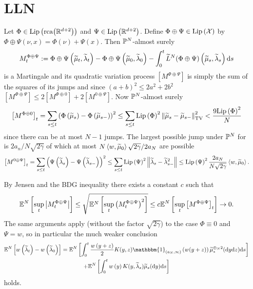 \section{LLN}
Let $\Phi \in \mathrm{Lip}\left({\mathrm{rca}{\left({\mathbb{R}^{d+2}}\right)}}\right)$ and $\Psi \in \mathrm{Lip}\left({\mathbb{R}^{d+2}}\right)$.  Define $\Phi \oplus \Psi \in \mathrm{Lip}\left({\mathcal{X}}\right)$ by
$\Phi \oplus \Psi(\nu,x) = \Phi(\nu) + \Psi(x)$.  Then $\mathbb{P}^N$-almost surely
\begin{equation}
    M^{\Phi \oplus \Psi}_t := \Phi \oplus \Psi\left(\widetilde{\mu}_t, \widetilde{\lambda}_t\right) - \Phi \oplus \Psi\left(\widetilde{\mu}_0, \widetilde{\lambda}_0\right)
    - \int_0^t \widetilde{L}^N (\Phi \oplus \Psi)\left(\widetilde{\mu}_s, \widetilde{\lambda}_s\right) \mathrm{d} s
\end{equation}
is a Martingale and its quadratic variation process $[M^{\Phi \oplus \Psi}]$ is simply the sum of the squares of its jumps and since $(a+b)^2 \leq 2a^2 + 2b^2$ $[M^{\Phi \oplus \Psi}] \leq 2[M^{\Phi \oplus 0}] + 2[M^{0 \oplus \Psi}] $.  
Now $\mathbb{P}^N$-almost surely
\begin{equation}
    \left[M^{\Phi \oplus 0}\right]_t = 
    \sum_{s \leq t} \left(\Phi\left(\tmu_s\right) - \Phi\left(\tmu_{s-}\right)\right)^2
    \leq
    \sum_{s \leq t} \lip{\Phi}^2\norm{\tmu_s -  \tmu_{s-}}_\mathrm{TV}^2 
    <
    \frac{9  \lip{\Phi}^2}{N}
\end{equation}
since there can be at most $N -1$ jumps.
The largest possible jump under $\mathbb{P}^N$ for \tl is $2a_n / N\sqrt{2\gamma}$ of which at most $N\left<w,\widetilde{\mu}_0\right>\sqrt{2\gamma}/2a_N$ are possible
\begin{equation}
    \left[M^{0\oplus \Psi}\right]_t = 
    \sum_{s \leq t} \left(\Psi\left(\tl_s\right) - \Psi\left(\tl_{s-}\right)\right)^2
    \leq
    \sum_{s \leq t}\lip{\Psi}^2\norm{\tl_{s} - \tl_{s-}^2}
    \leq
    \lip{\Psi}^2 \frac{2a_N}{N\sqrt{2\gamma}}\left<w,\tmu_0\right>.
\end{equation}

By Jensen and the BDG inequality \cite[Thrm. 26.12]{K02} there exists a constant $c$ such that
\begin{equation*}
    \mathbb{E}^N\left[\sup_{t}\left\lvert{M^{\Phi \oplus \Psi}_t}\right\rvert\right]
    \leq \sqrt{\mathbb{E}^N\left[\sup_{t}\left(M^{\Phi \oplus \Psi}_t\right)^2\right]}
    \leq c\mathbb{E}^N\left[\sup_t \left[M^{\Phi \oplus \Psi}\right]_t\right] \rightarrow 0.
\end{equation*}
The same arguments apply (without the factor $\sqrt{2\gamma}$) to the case $\Phi \equiv 0$ and $\Psi = w$, so in particular the much weaker conclusion
\begin{multline}\label{e:expected-w-transfer}
    \EE^N\left[w\left(\tl_t\right) - w\left(\tl_0\right)\right]
    =
    \EE^N\left[\int_0^t \frac{w\left(y+z\right)}{2}
    K(y,z)\mathbbm{1}_{(a_N,\infty)}\left(w(y+z)\right)\tmu^{\oplus_N 2}_s(\dd y\dd z) \dd s\right]\\
    +
    \EE^N\left[\int_0^t w\left(y\right)
    K(y,\tl_s)\tmu_s(\dd y) \dd s\right]
\end{multline}
holds.

